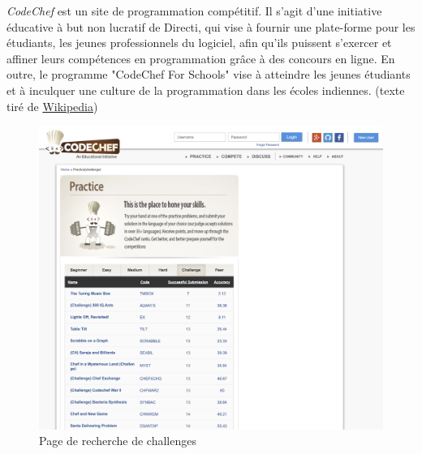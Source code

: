 \textit{CodeChef} est un site de programmation compétitif. Il s'agit d'une initiative éducative à but non lucratif de Directi, qui vise à fournir une plate-forme pour les étudiants, les jeunes professionnels du logiciel, afin qu'ils puissent s'exercer et affiner leurs compétences en programmation grâce à des concours en ligne. En outre, le programme "CodeChef For Schools" vise à atteindre les jeunes étudiants et à inculquer une culture de la programmation dans les écoles indiennes. (texte tiré de \href{https://en.wikipedia.org/wiki/CodeChef}{Wikipedia})

\begin{figure}[H]
    \includegraphics[width=\textwidth,height=0.35\textheight,keepaspectratio]{images/comparison/codechef-1.png}
    \centering
    \caption[Codechef : page de recherche de challenges]{Page de recherche de challenges}
\end{figure}

